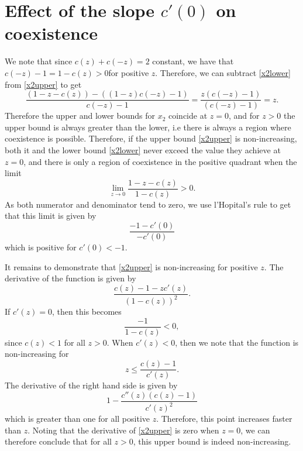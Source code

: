 \section{Effect of the slope $c'(0)$ on coexistence}
\label{appendix1a}
We note that since $c(z)+c(-z)=2$ constant, we have that $c(-z)-1=1-c(z)>0$for positive $z$. Therefore, we can subtract \eqref{x2lower} from \eqref{x2upper} to get
\[
\frac{(1-z-c(z))-((1-z)c(-z)-1)}{c(-z)-1}=\frac{z(c(-z)-1)}{(c(-z)-1)}=z.
\]
Therefore the upper and lower bounds for $x_2$ coincide at $z=0$, and for $z>0$ the upper bound is always greater than the lower, i.e there is always a region where coexistence is possible. Therefore, if the upper bound \eqref{x2upper} is non-increasing, both it and the lower bound \eqref{x2lower} never exceed the value they achieve at $z=0$, and there is only a region of coexistence in the positive quadrant when the limit
\[
\lim_{z \to 0}\frac{1-z-c(z)}{1-c(z)} >0.
\]
As both numerator and denominator tend to zero, we use l'Hopital's rule to get that this limit is given by
\[
\frac{-1-c'(0)}{-c'(0)}
\]
which is positive for $c'(0)<-1$.

It remains to demonstrate that \eqref{x2upper} is non-increasing for positive $z$. The derivative of the function is given by
\[
\frac{c(z)-1-zc'(z)}{(1-c(z))^2}.
\]
If $c'(z)=0$, then this becomes
\[
\frac{-1}{1-c(z)}<0, \]
since $c(z)<1$ for all $z>0$. When $c'(z)<0$, then we note that the function is non-increasing for 
\[
z\leq \frac{c(z)-1}{c'(z)}.
\]
The derivative of the right hand side is given by
\[
1-\frac{c''(z)(c(z)-1)}{c'(z)^2}
\]
which is greater than one for all positive $z$. Therefore, this point increases faster than $z$. Noting that the derivative of \eqref{x2upper} is zero when $z=0$, we can therefore conclude that for all $z>0$, this upper bound is indeed non-increasing.

